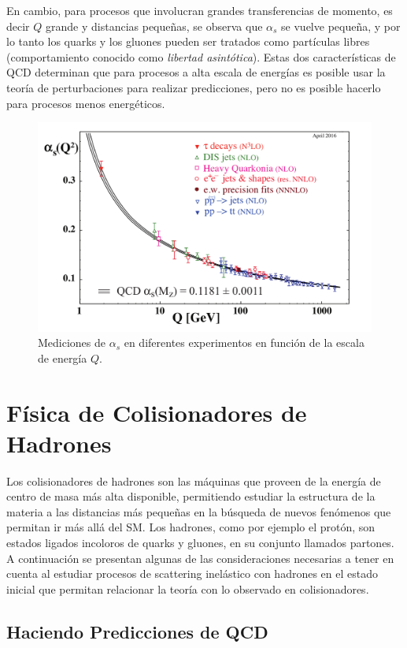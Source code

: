 En cambio, para procesos que involucran grandes transferencias de momento, es decir $Q$ grande y distancias pequeñas, se observa que $\alpha_s$ se vuelve pequeña, y por lo tanto los quarks y los gluones pueden ser tratados como partículas libres (comportamiento conocido como \emph{libertad asintótica}). Estas dos características de QCD determinan que para procesos a alta escala de energías es posible usar la teoría de perturbaciones para realizar predicciones, pero no es posible hacerlo para procesos menos energéticos.
\begin{figure}[h]
    \centering
    \includegraphics[width =0.8\linewidth]{images/runningConstant}
    \caption{Mediciones de $\alpha_s$ en diferentes experimentos en función de la escala de energía $Q$\cite{ParticleDataGroup}.}
    \label{fig:runningConstant}
\end{figure}

\section{Física de Colisionadores de Hadrones}

Los colisionadores de hadrones son las máquinas que proveen de la energía de centro de masa más alta disponible, permitiendo estudiar la estructura de la materia a las distancias más pequeñas en la búsqueda de nuevos fenómenos que permitan ir más allá del SM. Los hadrones, como por ejemplo el protón, son estados ligados incoloros de quarks y gluones, en su conjunto llamados partones. A continuación se presentan algunas de las consideraciones necesarias a tener en cuenta al estudiar procesos de scattering inelástico con hadrones en el estado inicial que permitan relacionar la teoría con lo observado en colisionadores.  

\subsection{Haciendo Predicciones de QCD}\label{predictions}

